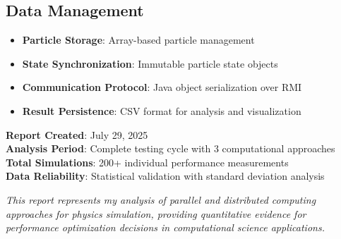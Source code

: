 \documentclass[12pt,a4paper]{article}
\begin{document}
\subsection{Data Management}
\begin{itemize}
    \item \textbf{Particle Storage}: Array-based particle management
    \item \textbf{State Synchronization}: Immutable particle state objects
    \item \textbf{Communication Protocol}: Java object serialization over RMI
    \item \textbf{Result Persistence}: CSV format for analysis and visualization
\end{itemize}



\vspace{1cm}

\textbf{Report Created}: July 29, 2025\\
\textbf{Analysis Period}: Complete testing cycle with 3 computational approaches\\
\textbf{Total Simulations}: 200+ individual performance measurements\\
\textbf{Data Reliability}: Statistical validation with standard deviation analysis

\vspace{0.5cm}

\textit{This report represents my analysis of parallel and distributed computing approaches for physics simulation, providing quantitative evidence for performance optimization decisions in computational science applications.}
\end{document}
